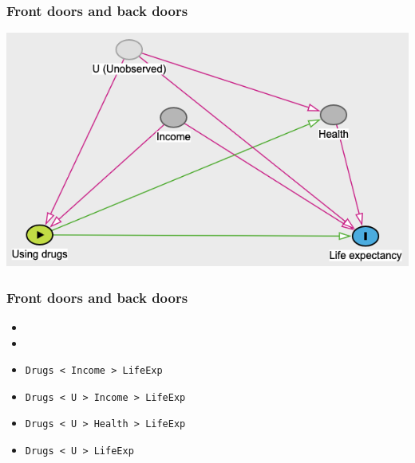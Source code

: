 \documentclass[aspectratio=43]{beamer}
\begin{document}
\begin{frame}
\frametitle{Front doors and back doors}
\centering

\includegraphics[width = \textwidth]{../img/drugs_dag2}

\end{frame}

\begin{frame}
\frametitle{Front doors and back doors}
\centering

\begin{itemize}
  \item {}
  \item {}
  \item \texttt{Drugs < Income > LifeExp}
  \item \texttt{Drugs < U > Income > LifeExp}
  \item \texttt{Drugs < U > Health > LifeExp}
  \item \texttt{Drugs < U > LifeExp}
\end{itemize}

\end{frame}
\end{document}
